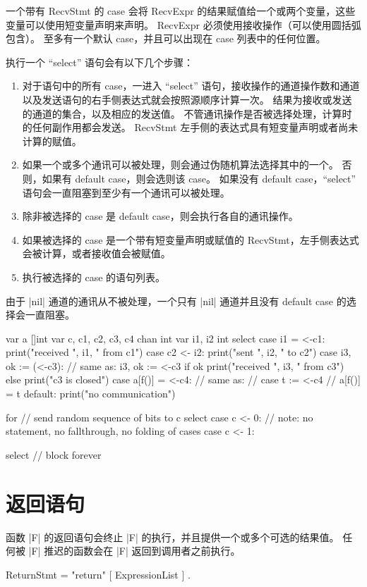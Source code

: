 一个带有 RecvStmt 的 case 会将 RecvExpr 的结果赋值给一个或两个变量，这些变量可以使用短变量声明来声明。
RecvExpr 必须使用接收操作（可以使用圆括弧包含）。
至多有一个默认 case，并且可以出现在 case 列表中的任何位置。

执行一个 ``select'' 语句会有以下几个步骤：
\begin{enumerate}
\item 
对于语句中的所有 case，一进入 ``select'' 语句，接收操作的通道操作数和通道以及发送语句的右手侧表达式就会按照源顺序计算一次。
结果为接收或发送的通道的集合，以及相应的发送值。
不管通讯操作是否被选择处理，计算时的任何副作用都会发送。
RecvStmt 左手侧的表达式具有短变量声明或者尚未计算的赋值。
\item 
如果一个或多个通讯可以被处理，则会通过伪随机算法选择其中的一个。
否则，如果有 default case，则会选则该 case。
如果没有 default case，``select'' 语句会一直阻塞到至少有一个通讯可以被处理。
\item 
除非被选择的 case 是 default case，则会执行各自的通讯操作。
\item 
如果被选择的 case 是一个带有短变量声明或赋值的 RecvStmt，左手侧表达式会被计算，或者接收值会被赋值。
\item 
执行被选择的 case 的语句列表。
\end{enumerate}

由于 \code|nil| 通道的通讯从不被处理，一个只有 \code|nil| 通道并且没有 default  case 的选择会一直阻塞。
\begin{golang}
var a []int
var c, c1, c2, c3, c4 chan int
var i1, i2 int
select {
case i1 = <-c1:
	print("received ", i1, " from c1\n")
case c2 <- i2:
	print("sent ", i2, " to c2\n")
case i3, ok := (<-c3):  // same as: i3, ok := <-c3
	if ok {
		print("received ", i3, " from c3\n")
	} else {
		print("c3 is closed\n")
	}
case a[f()] = <-c4:
	// same as:
	// case t := <-c4
	//	a[f()] = t
default:
	print("no communication\n")
}

for {  // send random sequence of bits to c
	select {
	case c <- 0:  // note: no statement, no fallthrough, no folding of cases
	case c <- 1:
	}
}

select {}  // block forever
\end{golang}


\section{返回语句}
函数 \code|F| 的返回语句会终止 \code|F| 的执行，并且提供一个或多个可选的结果值。
任何被 \code|F|  推迟的函数会在 \code|F| 返回到调用者之前执行。
\begin{EBNF}
ReturnStmt = "return" [ ExpressionList ] .
\end{EBNF}


